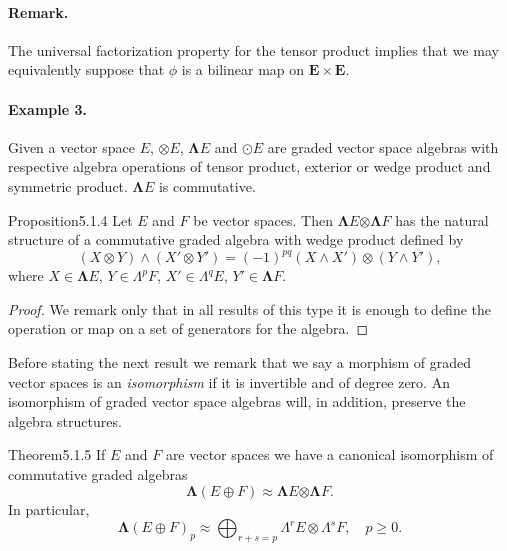 \paragraph{Remark.} The universal factorization property for the tensor product implies that we may equivalently suppose that $\phi$ is a bilinear map on $\mathbf E\times\mathbf E$.
\paragraph{Example 3.} Given a vector space $E$, $\boldsymbol\otimes E$, $\boldsymbol\Lambda E$ and $\boldsymbol\odot E$ are graded vector space algebras with respective algebra operations of tensor product, exterior or wedge product and symmetric product. $\boldsymbol\Lambda E$ is commutative.
\begin{originaltheorem}{Proposition}{5.1.4}
Let $E$ and $F$ be vector spaces. Then $\boldsymbol\Lambda E\boldsymbol\otimes\boldsymbol\Lambda F$ has the natural structure of a commutative graded algebra with wedge product defined by
\[
(X\otimes Y)\wedge(X'\otimes Y')=(-1)^{pq}(X\wedge X')\otimes(Y\wedge Y'),
\]
where $X\in\boldsymbol\Lambda E$, $Y\in\Lambda^p F$, $X'\in\Lambda^q E$, $Y'\in\boldsymbol\Lambda F$.
\end{originaltheorem}
\begin{proof}
We remark only that in all results of this type it is enough to define the operation or map on a set of generators for the algebra.
\end{proof}
Before stating the next result we remark that we say a morphism of graded vector spaces is an \emph{isomorphism} if it is invertible and of degree zero. An isomorphism of graded vector space algebras will, in addition, preserve the algebra structures.
\begin{originaltheorem}{Theorem}{5.1.5}
If $E$ and $F$ are vector spaces we have a canonical isomorphism of commutative graded algebras
\[
\boldsymbol\Lambda(E\oplus F)\approx\boldsymbol\Lambda E\boldsymbol\otimes\boldsymbol\Lambda F.
\]
In particular,
\[
\boldsymbol\Lambda(E\oplus F)_p\approx\bigoplus_{r+s=p}\Lambda^r E\otimes\Lambda^s F,\quad p\geq0.
\]
\end{originaltheorem}
